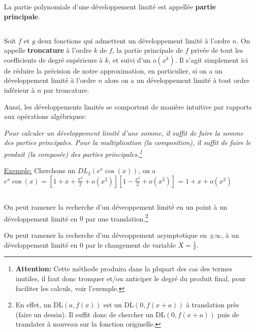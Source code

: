 La partie polynomiale d'une développement limité est appellée \textbf{partie principale}.

\subsection*{}

Soit \(f\) et \(g\) deux fonctions qui admettent un développement limité à l'ordre \(n\).\+
On appelle \textbf{troncature} à l'ordre \(k\) de \(f\), la partie principale de \(f\) privée de tout les coefficients de degré supérieurs à \(k\), et suivi d'un \(o(x^k)\). Il s'agit simplement ici de réduire la précision de notre approximation, en particulier, si on a un développement limité à l'ordre \(n\) alors on a un développement limité à tout ordre inférieur à \(n\) par troncature.\<

Aussi, les développements limités se comportent de manière intuitive par rapports aux opérations algébriques:
\begin{center}
   \textit{Pour calculer un développement limité d'une somme, il suffit de faire la somme des parties principales. \+
   Pour la multiplication (la composition), il suffit de faire le produit (la composée) des parties principales.\footnote[1]{\textbf{Attention:} Cette méthode produira dans la plupart des cas des termes inutiles, il faut donc tronquer et/ou anticiper le degré du produit final, pour faciliter les calculs, voir l'exemple.} }
\end{center}

\underline{Exemple:} Cherchons un \(DL_2(e^x\cos(x))\), on a \(e^x\cos(x) = [1 + x + \frac{x^2}{2}+o(x^2)] [1 - \frac{x^2}{2} + o(x^2)]  \) = \(1 + x + o(x^2)\)

\subsection*{}

On peut ramener la recherche d'un déveoppement limité en un point à un développement limité en \(0\) par une translation.\footnote[1]{En effet, un DL\((a, f(x))\) est un DL\((0, f(x + a))\) à translation près (faire un dessin). Il suffit donc de chercher un DL\((0, f(x + a))\) puis de translater à nouveau sur la fonction originelle.}\<

On peut ramener la recherche d'un déveoppement asymptotique en \(\pm \infty\), à un développement limité en \(0\) par le changement de variable
\( X = \frac{1}{x}\).\<

